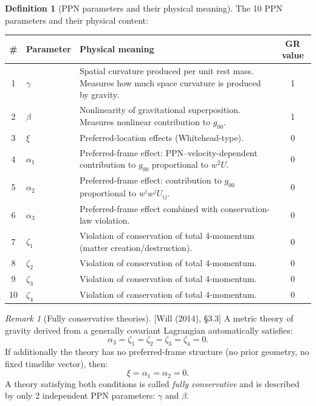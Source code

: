 \documentclass[11pt,a4paper]{article}
\theoremstyle{plain}
\theoremstyle{definition}
\newtheorem{definition}[theorem]{Definition}
\theoremstyle{remark}
\newtheorem{remark}[theorem]{Remark}
\newcommand{\fromlit}[1]{\textcolor{sctblue}{\textsf{[#1]}}}
\begin{document}
\begin{definition}[PPN parameters and their physical meaning]
\label{def:ppn-params}
The 10 PPN parameters and their physical content:
\begin{center}
\renewcommand{\arraystretch}{1.25}
\begin{longtable}{clp{7.5cm}c}
\toprule
\# & Parameter & Physical meaning & GR value \\
\midrule
\endhead
1 & $\gamma$ & Spatial curvature produced per unit rest mass.
  Measures how much space curvature is produced by gravity. & 1 \\
2 & $\beta$ & Nonlinearity of gravitational superposition.
  Measures nonlinear contribution to $g_{00}$. & 1 \\
3 & $\xi$ & Preferred-location effects (Whitehead-type). & 0 \\
4 & $\alpha_1$ & Preferred-frame effect: PPN--velocity-dependent
  contribution to $g_{00}$ proportional to $w^2 U$. & 0 \\
5 & $\alpha_2$ & Preferred-frame effect: contribution to $g_{00}$
  proportional to $w^i w^j U_{ij}$. & 0 \\
6 & $\alpha_3$ & Preferred-frame effect combined with
  conservation-law violation.  & 0 \\
7 & $\zeta_1$ & Violation of conservation of total
  4-momentum (matter creation/destruction). & 0 \\
8 & $\zeta_2$ & Violation of conservation of total
  4-momentum. & 0 \\
9 & $\zeta_3$ & Violation of conservation of total
  4-momentum. & 0 \\
10 & $\zeta_4$ & Violation of conservation of total
  4-momentum. & 0 \\
\bottomrule
\end{longtable}
\end{center}
\end{definition}

\begin{remark}[Fully conservative theories]
\fromlit{Will (2014), \S3.3}
A metric theory of gravity derived from a generally covariant
Lagrangian automatically satisfies:
\begin{equation}\label{eq:conservative}
  \alpha_3 = \zeta_1 = \zeta_2 = \zeta_3 = \zeta_4 = 0.
\end{equation}
If additionally the theory has no preferred-frame structure
(no prior geometry, no fixed timelike vector), then:
\begin{equation}\label{eq:no-preferred}
  \xi = \alpha_1 = \alpha_2 = 0.
\end{equation}
A theory satisfying both conditions is called \emph{fully
conservative} and is described by only 2 independent PPN parameters:
$\gamma$ and $\beta$.
\end{remark}
\end{document}
